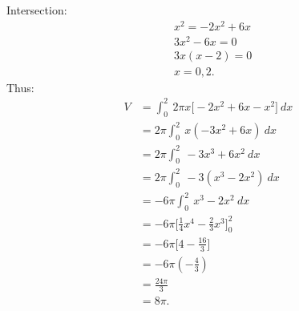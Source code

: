 \documentclass{report}
\begin{document}
    \begin{minipage}[]{0.47\textwidth}
        Intersection:
        \begin{align*}
            &x^{2} = -2x^{2} +6x \\ 
            &3x^{2}-6x = 0 \\
            &3x(x-2) =0 \\
            &x=0,2
        .\end{align*}
        Thus:
        \begin{align*}
            V &= \int_{0}^{2}\ 2\pi x\bigg[-2x^{2}+6x - x^{2}\bigg]\ dx  \\
              &=2\pi\int_{0}^{2}\ x(-3x^{2}+6x)\ dx \\
              &=2\pi\int_{0}^{2}\ -3x^{3}+6x^{2}\ dx  \\
              &=2\pi\int_{0}^{2}\ -3(x^{3}-2x^{2})\ dx \\
              &=-6\pi\int_{0}^{2}\ x^{3}-2x^{2}\ dx \\
              &=-6\pi \bigg[\frac{1}{4}x^{4}-\frac{2}{3}x^{3}\bigg]_0^{2} \\
              &=-6\pi\bigg[4-\frac{16}{3}\bigg] \\
              &=-6\pi(-\frac{4}{3}) \\
              &= \frac{24\pi}{3} \\
              &= 8\pi
        .\end{align*}
    
    \end{minipage}






    




    
    
\end{document}
